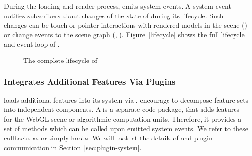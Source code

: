 \documentclass[../ClassicThesis.tex]{subfiles}
\begin{document}
During the loading and render process, {\convertify} emits
system events. A system event notifies subscribers about
changes of the state of {\convertify} during its lifecycle.
Such changes can be touch or pointer interactions with
rendered models in the scene () or
change events to the scene graph (,
). Figure~\ref{lifecycle} shows the full
lifecycle and event loop of {\convertify}.

\begin{figure}[h]
  \centering
  \caption{The complete lifecycle of {\convertify}}
  \label{fig:lifecycle}
\end{figure}

\subsubsection{{\convertify} Integrates Additional Features
  Via Plugins}

{\convertify} loads additional features into its system via
.  encourage to decompose
feature sets into independent components. A 
is a separate code package, that adds features for the WebGL
scene or algorithmic computation units. Therefore, it
provides a set of methods which can be called upon emitted
system events. We refer to these callbacks as
 or simply hooks. We will look at the
details of  and plugin communication in
Section~\ref{sec:plugin-system}.



\end{document}
